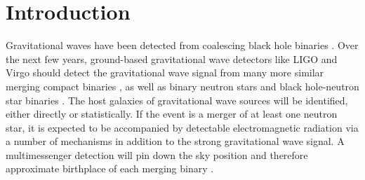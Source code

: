 \documentclass[nofootinbib,twocolumn,prd]{emulateapj}
\newcommand\editremark[1]{{\color{red}#1}}
\begin{document}
\maketitle







\section{Introduction}
Gravitational waves have been detected from  coalescing  black hole binaries \citep{DiscoveryPaper,LIGO-O1-BBH}. 
Over the next few years, ground-based gravitational wave detectors like LIGO 
and Virgo  should detect the gravitational
wave signal from many more similar merging compact binaries \citep{LIGO-O1-BBH,RatesPaper,gwastro-EventPopsynPaper-2016}, as well as  binary  neutron stars and black hole-neutron star binaries \citep{LIGO-Inspiral-Rates,popsyn-LowMetallicityImpact2c-StarTrackRevised-2014}.
%
The host galaxies of gravitational wave sources will be identified, either directly or statistically.  
If the event is a merger of at least one neutron star, it is expected to be accompanied by detectable
electromagnetic radiation  via a number of  mechanisms \citep[see][and references therein]{Metzger16} in addition to the strong gravitational wave signal. %
A multimessenger detection will pin down
the sky position and therefore approximate birthplace of each merging binary \citep{Nissanke13}.    
\end{document}
